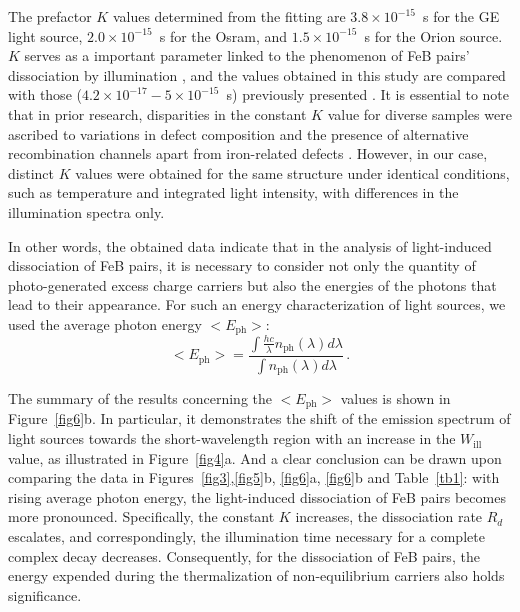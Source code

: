 \documentclass{WileyMSP-template}
\begin{document}
The prefactor $K$ values determined from the fitting are
$3.8\times10^{-15}$~s for the GE light source,
$2.0\times10^{-15}$~s for the Osram, and
$1.5\times10^{-15}$~s for the Orion source.
$K$ serves as a important parameter linked to the phenomenon of FeB pairs' dissociation by illumination \cite{FeBKin2019},
and the values obtained in this study are compared with those ($4.2\times10^{-17}-5\times10^{-15}$~s) previously presented \cite{FeBLight2,FeBAssJAP2014,FeBKin2019}.
It is essential to note that in prior research, disparities in the constant $K$ value for diverse samples were ascribed
to variations in defect composition and the presence of alternative recombination channels apart from iron-related defects \cite{FeBLight2,FeBAssJAP2014}.
However, in our case, distinct $K$ values were obtained for the same structure under identical conditions, such as temperature and integrated light intensity,
with differences in the illumination spectra only.

In other words, the obtained data indicate that in the analysis of light-induced dissociation of FeB pairs,
it is necessary to consider not only the quantity of photo-generated excess charge carriers
but also the energies of the photons that lead to their appearance.
For such an energy characterization of light sources, we used the average photon energy $<E_\mathrm{ph}>$:
\begin{equation}
\label{eqEaver}
<E_\mathrm{ph}>=\frac{\int \frac{hc}{\lambda}n_\mathrm{ph}(\lambda)d\lambda}{\int n_\mathrm{ph}(\lambda)d\lambda}\,.
\end{equation}


The summary of the results concerning the $<E_\mathrm{ph}>$ values is shown in Figure~\ref{fig6}b.
In particular, it demonstrates the shift of the emission spectrum of light sources
towards the short-wavelength region with an increase in the $W_\mathrm{ill}$ value, as illustrated in Figure~\ref{fig4}a.
And a clear conclusion can be drawn upon comparing the data in Figures~\ref{fig3},\ref{fig5}b, \ref{fig6}a, \ref{fig6}b
and Table~\ref{tb1}:
with rising average photon energy, the light-induced dissociation of FeB pairs becomes more pronounced.
Specifically, the constant $K$ increases, the dissociation rate $R_d$ escalates,
and correspondingly, the illumination time necessary for a complete complex decay decreases.
Consequently, for the dissociation of FeB pairs, the energy expended during the thermalization of non-equilibrium carriers also holds significance.
\end{document}
